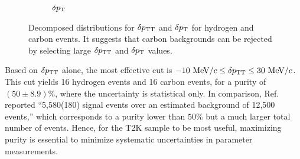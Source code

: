 \begin{figure}
\begin{subfigure}[b]{\dbfigwid\textwidth}
          \caption{$\delta p_\textrm{T}$}
          \label{subfig:hsel-dpt-stack}
     \end{subfigure}
     \caption{Decomposed distributions for $\delta p_\textrm{TT}$ and $\delta p_\textrm{T}$ for hydrogen and carbon events.
     It suggests that carbon backgrounds can be rejected by selecting large $\delta p_\textrm{TT}$ and $\delta p_\textrm{T}$ values.
     }
     \label{fig:hsel-tki-decomp}
     \end{figure}
     Based on $\delta p_\textrm{TT}$ alone, the most effective cut is $-10~\textrm{MeV}/c \leq \delta p_\textrm{TT} \leq 30~\textrm{MeV}/c$.
     This cut yields 16 hydrogen events and 16 carbon events, for a purity of $(50\pm8.9)\%$, where the uncertainty is statistical only.
     In comparison, Ref.~\cite{MINERvA:2023avz} reported ``5,580(180) signal events over an estimated background of 12,500 events,'' which corresponds to a purity lower than $50\%$ but a much larger total number of events.
     Hence, for the T2K sample to be most useful, maximizing purity is essential to minimize systematic uncertainties in parameter measurements.

